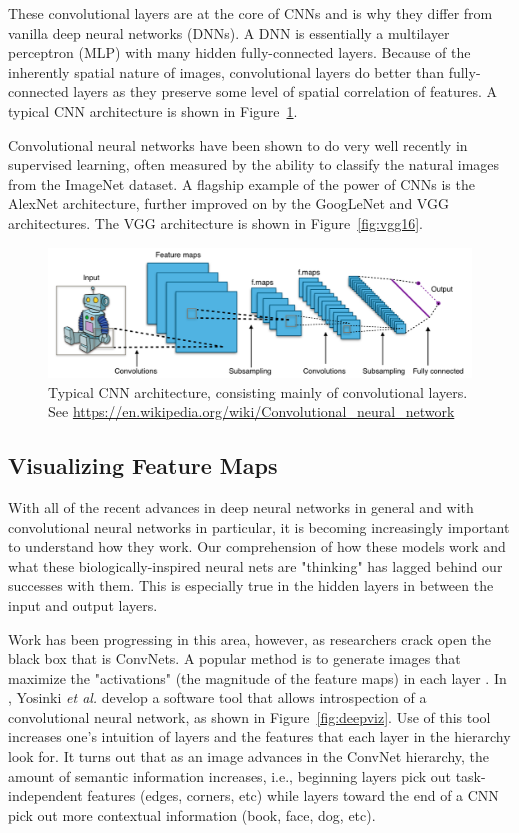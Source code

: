 \documentclass[hidelinks]{article}
\begin{document}
These convolutional layers are at the core of CNNs and is why they differ from vanilla deep neural networks (DNNs). A DNN is essentially a multilayer perceptron (MLP) with many hidden fully-connected layers. Because of the inherently spatial nature of images, convolutional layers do better than fully-connected layers as they preserve some level of spatial correlation of features. A typical CNN architecture is shown in Figure~\ref{fig:typical_cnn}.

Convolutional neural networks have been shown to do very well recently in supervised learning, often measured by the ability to classify the natural images from the ImageNet dataset. A flagship example of the power of CNNs is the AlexNet architecture\cite{Krizhevsky2012}, further improved on by the GoogLeNet \cite{Szegedy2014} and VGG \cite{Simonyan2015} architectures. The VGG architecture is shown in Figure~\ref{fig:vgg16}.

\begin{figure}[H]
  \centering
  \includegraphics[scale=0.30]{typical_cnn}
  \caption{Typical CNN architecture, consisting mainly of convolutional layers.
    \newline See \url{https://en.wikipedia.org/wiki/Convolutional_neural_network}}
  \label{fig:typical_cnn}
\end{figure}

\subsection{Visualizing Feature Maps}
With all of the recent advances in deep neural networks in general and with convolutional neural networks in particular, it is becoming increasingly important to understand how they work. Our comprehension of how these models work and what these biologically-inspired neural nets are "thinking" has lagged behind our successes with them. This is especially true in the hidden layers in between the input and output layers.

Work has been progressing in this area, however, as researchers crack open the black box that is ConvNets. A popular method is to generate images that maximize the "activations" (the magnitude of the feature maps) in each layer \cite{Zeiler2014, Yosinski2015, Simonyan2014}. In \cite{Yosinski2015}, Yosinki \textit{et al.} develop a software tool that allows introspection of a convolutional neural network, as shown in Figure~\ref{fig:deepviz}. Use of this tool increases one's intuition of layers and the features that each layer in the hierarchy look for. It turns out that as an image advances in the ConvNet hierarchy, the amount of semantic information increases, i.e., beginning layers pick out task-independent features (edges, corners, etc) while layers toward the end of a CNN pick out more contextual information (book, face, dog, etc).
\end{document}
